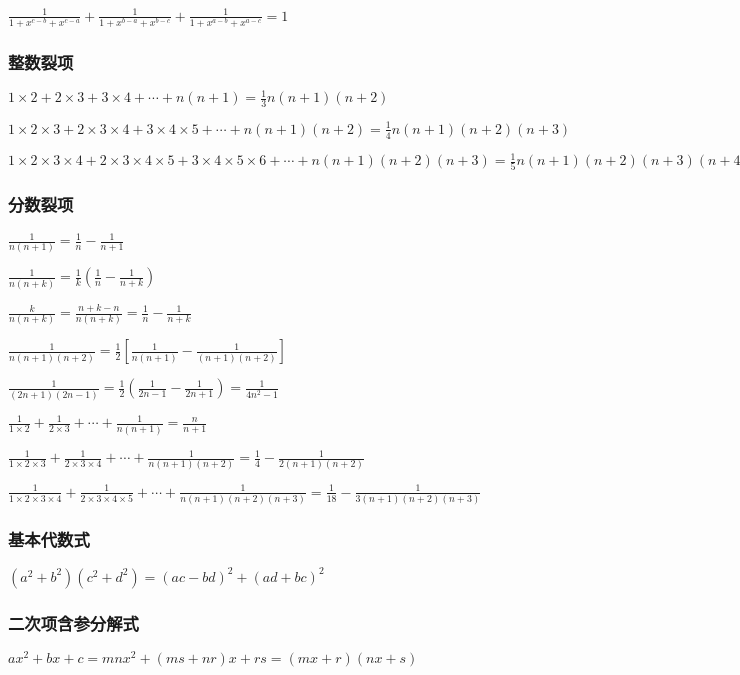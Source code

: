 \documentclass[UTF8]{ctexart}
\begin{document}
$\frac{1}{1+x^{c-b}+x^{c-a}}+\frac{1}{1+x^{b-a}+x^{b-c}}+\frac{1}{1+x^{a-b}+x^{a-c}}=1$

\subsubsection{整数裂项}

$1\times 2+2\times 3+3\times 4+ \cdots +n(n+1)=\frac{1}{3}n(n+1)(n+2)$

$1\times 2\times 3+2\times 3\times 4+3\times 4\times 5+\cdots
+n(n+1)(n+2)=\frac{1}{4}n(n+1)(n+2)(n+3)$

$1\times 2\times 3\times 4+2\times 3\times 4\times 5+3\times 4\times 5\times 6+ \cdots
+n(n+1)(n+2)(n+3)=\frac{1}{5}n(n+1)(n+2)(n+3)(n+4)$

\subsubsection{分数裂项}

$\frac{1}{n(n+1)} =\frac{1}{n} -\frac{1}{n+1}$

$\frac{1}{n(n+k)} =\frac{1}{k} (\frac{1}{n}-\frac{1}{n+k})$

$\frac{k}{n(n+k)} =\frac{n+k-n}{n(n+k)} =\frac{1}{n}-\frac{1}{n+k}$

$\frac{1}{n(n+1)(n+2)} =\frac{1}{2} [\frac{1}{n(n+1)} -\frac{1}{(n+1)(n+2)} ]$

$\frac{1}{(2n+1)(2n-1)} =\frac{1}{2} (\frac{1}{2n-1} -\frac{1}{2n+1} )=\frac{1}{4n^2-1}$

$\frac{1}{1\times 2} +\frac{1}{2\times 3} +\cdots +\frac{1}{n(n+1)} =\frac{n}{n+1}$

$\frac{1}{1\times 2\times 3} +\frac{1}{2\times 3\times 4} +\cdots +\frac{1}{n(n+1)(n+2)}
=\frac{1}{4} -\frac{1}{2(n+1)(n+2)}$

$\frac{1}{1\times 2\times 3\times 4} +\frac{1}{2\times 3\times 4\times 5} +\cdots
+\frac{1}{n(n+1)(n+2)(n+3)}=\frac{1}{18} -\frac{1}{3(n+1)(n+2)(n+3)}$

\subsubsection{基本代数式}

$(a^2+b^2)(c^2+d^2)=(ac-bd)^2+(ad+bc)^2$

\subsubsection{二次项含参分解式}

$ax^2+bx+c=mnx^2+(ms+nr)x+rs=(mx+r)(nx+s)$
\end{document}
